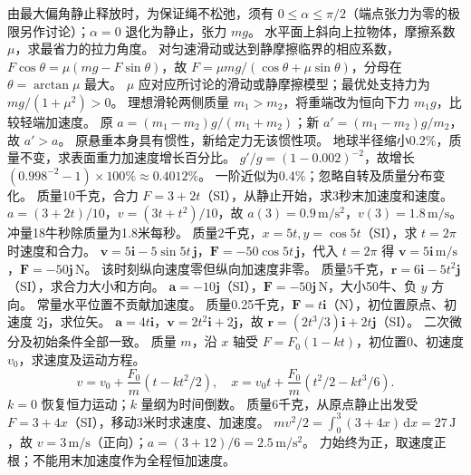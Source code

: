 \crosscheck 由最大偏角静止释放时，为保证绳不松弛，须有 $0\le\alpha\le\pi/2$（端点张力为零的极限另作讨论）；$\alpha=0$ 退化为静止，张力 $mg$。
\problemtext 水平面上斜向上拉物体，摩擦系数 $\mu$，求最省力的拉力角度。
\workings 对匀速滑动或达到静摩擦临界的相应系数，$F\cos\theta=\mu(mg-F\sin\theta)$，故 $F=\mu mg/(\cos\theta+\mu\sin\theta)$，分母在 $\theta=\arctan\mu$ 最大。
\crosscheck $\mu$ 应对应所讨论的滑动或静摩擦模型；最优处支持力为 $mg/(1+\mu^2)>0$。
\problemtext 理想滑轮两侧质量 $m_1>m_2$，将重端改为恒向下力 $m_1g$，比较轻端加速度。
\workings 原 $a=(m_1-m_2)g/(m_1+m_2)$；新 $a'=(m_1-m_2)g/m_2$，故 $a'>a$。
\crosscheck 原悬重本身具有惯性，新给定力无该惯性项。
\problemtext 地球半径缩小0.2\%，质量不变，求表面重力加速度增长百分比。
\workings $g'/g=(1-0.002)^{-2}$，故增长 $(0.998^{-2}-1)\times100\%\approx0.4012\%$。
\crosscheck 一阶近似为0.4\%；忽略自转及质量分布变化。
\problemtext 质量10千克，合力 $F=3+2t$（SI），从静止开始，求3秒末加速度和速度。
\workings $a=(3+2t)/10$，$v=(3t+t^2)/10$，故 $a(3)=0.9\,\mathrm{m/s^2}$，$v(3)=1.8\,\mathrm{m/s}$。
\crosscheck 冲量18牛秒除质量为1.8米每秒。
\problemtext 质量2千克，$x=5t,y=\cos5t$（SI），求 $t=2\pi$ 时速度和合力。
\workings $\bm v=5\bm i-5\sin5t\,\bm j$，$\bm F=-50\cos5t\,\bm j$，代入 $t=2\pi$ 得 $\bm v=5\bm i\,\mathrm{m/s}$，$\bm F=-50\bm j\,\mathrm N$。
\crosscheck 该时刻纵向速度零但纵向加速度非零。
\problemtext 质量5千克，$\bm r=6\bm i-5t^2\bm j$（SI），求合力大小和方向。
\workings $\bm a=-10\bm j$（SI），$\bm F=-50\bm j\,\mathrm N$，大小50牛、负 $y$ 方向。
\crosscheck 常量水平位置不贡献加速度。
\problemtext 质量0.25千克，$\bm F=t\bm i$（N），初位置原点、初速度 $2\bm j$，求位矢。
\workings $\bm a=4t\bm i$，$\bm v=2t^2\bm i+2\bm j$，故 $\bm r=(2t^3/3)\bm i+2t\bm j$（SI）。
\crosscheck 二次微分及初始条件全部一致。
\problemtext 质量 $m$，沿 $x$ 轴受 $F=F_0(1-kt)$，初位置0、初速度 $v_0$，求速度及运动方程。
\workings
\[
v=v_0+\frac{F_0}{m}(t-kt^2/2),\quad
x=v_0t+\frac{F_0}{m}(t^2/2-kt^3/6).
\]
\crosscheck $k=0$ 恢复恒力运动；$k$ 量纲为时间倒数。
\problemtext 质量6千克，从原点静止出发受 $F=3+4x$（SI），移动3米时求速度、加速度。
\workings $mv^2/2=\int_0^3(3+4x)\,\mathrm dx=27\,\mathrm J$，故 $v=3\,\mathrm{m/s}$（正向）；$a=(3+12)/6=2.5\,\mathrm{m/s^2}$。
\crosscheck 力始终为正，取速度正根；不能用末加速度作为全程恒加速度。
